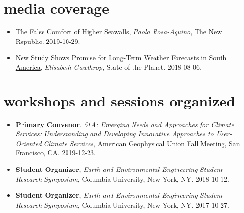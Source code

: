 \documentclass[11pt,article,oneside]{memoir}
\begin{document}

\section{media coverage}

\mbox{}\vspace{-\dimexpr\baselineskip\relax}

\begin{itemize}[label={}]

  \item \href{https://newrepublic.com/article/155519/false-comfort-higher-seawalls}{The False Comfort of Higher Seawalls}, \textit{Paola Rosa-Aquino}, The New Republic. 2019-10-29.

  \item \href{https://blogs.ei.columbia.edu/2018/08/06/subseasonal-weather-forecasts-paraguay/}{New Study Shows Promise for Long-Term Weather Forecasts in South America}, \textit{Elisabeth Gawthrop}, State of the Planet. 2018-08-06.

\end{itemize}


\section{workshops and sessions organized}

\mbox{}\vspace{-\dimexpr\baselineskip\relax}

\begin{itemize}[label={}]

  \item \textbf{Primary Convenor}, \textit{51A: Emerging Needs and Approaches for Climate Services: Understanding and Developing Innovative Approaches to User-Oriented Climate Services}, American Geophysical Union Fall Meeting, San Francisco, CA. 2019-12-23.

  \item \textbf{Student Organizer}, \textit{Earth and Environmental Engineering Student Research Symposium}, Columbia University, New York, NY. 2018-10-12.

  \item \textbf{Student Organizer}, \textit{Earth and Environmental Engineering Student Research Symposium}, Columbia University, New York, NY. 2017-10-27.

\end{itemize}
\end{document}
